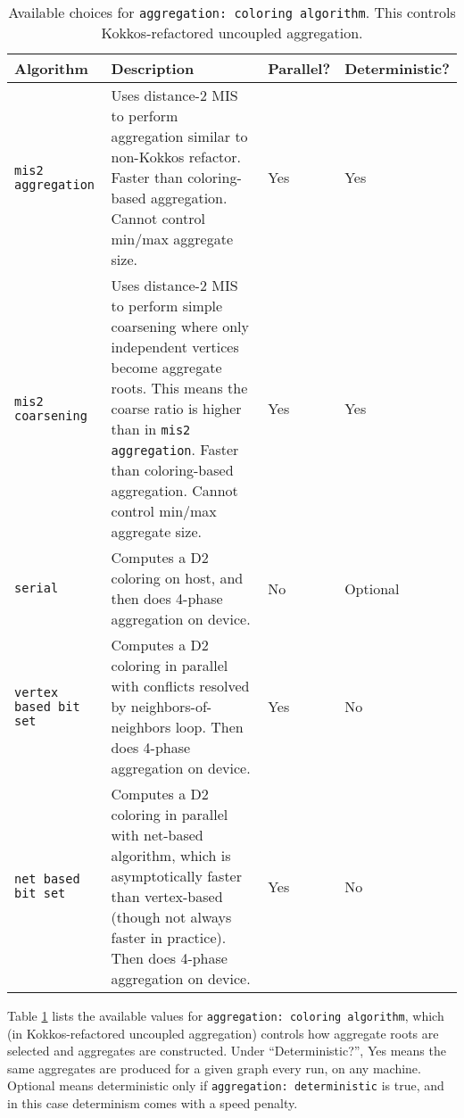 \begin{table}[H]
  \begin{center}
    \begin{tabular}{p{4.0cm} p{8.5cm} p{1.5cm} p{2.0cm}}
      Algorithm & Description & Parallel? & Deterministic? \\
      \toprule
      \verb!mis2 aggregation! &     Uses distance-2 MIS to perform aggregation similar to non-Kokkos refactor.
                                    Faster than coloring-based aggregation.
                                    Cannot control min/max aggregate size. & Yes & Yes \\
      \verb!mis2 coarsening! &      Uses distance-2 MIS to perform simple coarsening where only independent vertices become aggregate roots.
                                    This means the coarse ratio is higher than in \verb!mis2 aggregation!.
                                    Faster than coloring-based aggregation.  Cannot control min/max aggregate size. & Yes & Yes \\
      \verb!serial! &               Computes a D2 coloring on host, and then does 4-phase aggregation on device. & No & Optional \\
      \verb!vertex based bit set! & Computes a D2 coloring in parallel with conflicts resolved by neighbors-of-neighbors loop. Then does 4-phase aggregation on device. & Yes & No \\
      \verb!net based bit set! &    Computes a D2 coloring in parallel with net-based algorithm, which is asymptotically faster than vertex-based (though not always faster in practice).
                                    Then does 4-phase aggregation on device. & Yes & No \\
      \bottomrule
    \end{tabular}
    \caption{Available choices for \texttt{aggregation: coloring algorithm}. This controls Kokkos-refactored uncoupled aggregation. }
\label{t:coloring_algs}
  \end{center}
\end{table}

Table \ref{t:coloring_algs} lists the available values for \verb!aggregation: coloring algorithm!, which (in Kokkos-refactored uncoupled aggregation) controls how aggregate roots are selected and aggregates are constructed. Under ``Deterministic?'', Yes means the same aggregates are produced for a given graph every run, on any machine. Optional means deterministic only if \verb!aggregation: deterministic! is true, and in this case determinism comes with a speed penalty.

